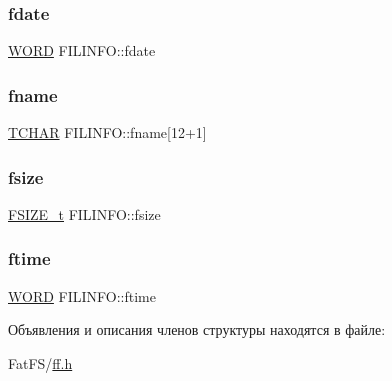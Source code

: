 \subsubsection{\texorpdfstring{fdate}{fdate}}
{\footnotesize\ttfamily \mbox{\hyperlink{ff_8h_a197942eefa7db30960ae396d68339b97}{W\+O\+RD}} F\+I\+L\+I\+N\+F\+O\+::fdate}

\mbox{\label{struct_f_i_l_i_n_f_o_ac06b247cfb3b708c76413c436e52fa7e}} 
\subsubsection{\texorpdfstring{fname}{fname}}
{\footnotesize\ttfamily \mbox{\hyperlink{ff_8h_a03bdb8ce5895c7e261aadc2529637546}{T\+C\+H\+AR}} F\+I\+L\+I\+N\+F\+O\+::fname\mbox{[}12+1\mbox{]}}

\mbox{\label{struct_f_i_l_i_n_f_o_a9e5b78ed7190f73de3ebcbdfbd6d1844}} 
\subsubsection{\texorpdfstring{fsize}{fsize}}
{\footnotesize\ttfamily \mbox{\hyperlink{ff_8h_a3fc0992ad7436250b6b1a0592214b7f2}{F\+S\+I\+Z\+E\+\_\+t}} F\+I\+L\+I\+N\+F\+O\+::fsize}

\mbox{\label{struct_f_i_l_i_n_f_o_ae0f751b79621bf7b29669f177bbe6b9a}} 
\subsubsection{\texorpdfstring{ftime}{ftime}}
{\footnotesize\ttfamily \mbox{\hyperlink{ff_8h_a197942eefa7db30960ae396d68339b97}{W\+O\+RD}} F\+I\+L\+I\+N\+F\+O\+::ftime}



Объявления и описания членов структуры находятся в файле\+:\begin{DoxyCompactItemize}
\item 
Fat\+F\+S/\mbox{\hyperlink{ff_8h}{ff.\+h}}\end{DoxyCompactItemize}
